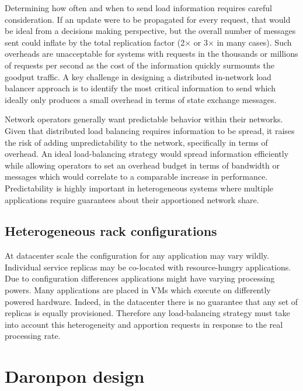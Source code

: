 Determining how often and when to send load information requires
careful consideration. If an update were to be propagated for every
request, that would be ideal from a decisions making perspective, but
the overall number of messages sent could inflate by the total
replication factor (2$\times$ or 3$\times$ in many cases).  Such
overheads are unacceptable for systems with requests in the thousands
or millions of requests per second as the cost of the information
quickly surmounts the goodput traffic. A key challenge in designing a
distributed in-network load balancer approach is to identify the most
critical information to send which ideally only produces a small
overhead in terms of state exchange messages.


Network operators generally want predictable behavior within their networks.
Given that distributed load balancing requires information to be spread, it
raises the risk of adding unpredictability to the network, specifically in
terms of overhead. An ideal load-balancing strategy would spread information
efficiently while allowing operators to set an overhead budget in terms of
bandwidth or messages which would correlate to a comparable increase in
performance. Predictability is highly important in heterogeneous systems where
multiple applications require guarantees about their apportioned network share.

\subsection{Heterogeneous rack configurations}

At datacenter scale the configuration for any application may vary wildly.
Individual service replicas may be co-located with resource-hungry applications.
Due to configuration differences applications might have varying processing
powers. Many applications are placed in VMs which execute on differently
powered hardware. Indeed, in the datacenter there is no guarantee that any set
of replicas is equally provisioned. Therefore any load-balancing strategy must
take into account this heterogeneity and apportion requests in response to the
real processing rate.

\section{Daronpon design}

